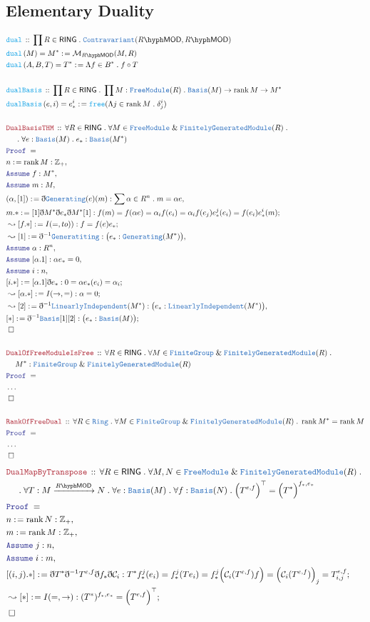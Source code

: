 \documentclass[12pt]{scrartcl}
\newcommand{\TYPE}[1]{\textcolor{NavyBlue}{\mathtt{#1}}}
\newcommand{\FUNC}[1]{\textcolor{Cerulean}{\mathtt{#1}}}
\newcommand{\LOGIC}[1]{\textcolor{Blue}{\mathtt{#1}}}
\newcommand{\THM}[1]{\textcolor{Maroon}{\mathtt{#1}}}
\renewcommand{\.}{\; . \;}
\newcommand{\de}{: \kern 0.1pc =}
\newcommand{\Act}[1]{\left(#1\right)}
\newcommand{\Theorem}[2]{& \THM{#1} \, :: \, #2 \\ & \Proof = \\ }
\newcommand{\DeclareFunc}[2]{& \FUNC{#1} \, :: \, #2 \\}
\newcommand{\DefineNamedFunc}[4]{&  \FUNC{#1}\Act{#2} = #3 \de #4 \\}
\newcommand{\NewLine}{\\ & \kern 1pc}
\newcommand{\Page}[1]{ \begin{align*} #1 \end{align*}   }
\newcommand{ \bd }{ \ByDef }
\newcommand{\NoProof}{ & \ldots \\ \EndProof}
\renewcommand{\And}{\; \& \;}
\newcommand{\Int}{\mathbb{Z} }
\newcommand{\Mor}{\mathcal{M}}
\newcommand{\Say}[3]{& #1 \de #2 : #3, \\}
\newcommand{\Conclude}[3]{& #1 \de #2 : #3; \\}
\newcommand{\Derive}[3]{& \leadsto #1 \de #2 : #3, \\}
\newcommand{\DeriveConclude}[3]{& \leadsto #1 \de #2 : #3 ; \\}
\newcommand{\Assume}[2]{& \LOGIC{Assume} \; #1 : #2, \\}
\newcommand{\QED}{\; \square}
\newcommand{\EndProof}{& \QED \\}
\newcommand{\ByDef}{\eth}
\newcommand{\Proof}{\LOGIC{Proof} \; }
\newcommand{\Arrow}[1]{\xrightarrow{#1}}
\newcommand{\Contra}{\TYPE{Contravariant}}
\newcommand{\C}{\mathcal{C}}
\newcommand{\FG}{\TYPE{FiniteGroup}}
\DeclareMathOperator{\rank}{rank}
\newcommand{\Basis}{\TYPE{Basis}}
\newcommand{\FGM}{\TYPE{FinitelyGeneratedModule}}
\newcommand{\LI}{\TYPE{LinearlyIndependent}}
\newcommand{\FM}{\TYPE{FreeModule}}
\newcommand{\LMOD}[1]{#1\hyph\mathsf{MOD}}
\newcommand{\Ring}{\TYPE{Ring}}
\newcommand{\RING}{\mathsf{RING}}
\begin{document}
\subsection{Elementary Duality}
\Page{
	\DeclareFunc{dual}{\prod R \in \RING \. \Contra(\LMOD{R},\LMOD{R})}
	\DefineNamedFunc{dual}{M}{M^*}{\Mor_{\LMOD{R}}(M,R)}
	\DefineNamedFunc{dual}{A,B,T}{T^*}{\Lambda f \in B^* \. f \circ T}
	\\
	\DeclareFunc{dualBasis}{\prod R \in \RING \. \prod M : \FM(R) \. \Basis(M) \to \rank M \to M^*}
	\DefineNamedFunc{dualBasis}{e,i}{e_*^i}{\FUNC{free}(\Lambda j \in \rank M \. \delta^i_j   )}
	\\
	\Theorem{DualBasisTHM}{\forall R \in \RING \. \forall M \in \FM \And \FGM(R) \. 
		\NewLine \. \forall e : \TYPE{Basis}(M) \. e_* : \TYPE{Basis}(M^*)}
	\Say{n}{\rank M}{\Int_+}
	\Assume{f}{M^*}
	\Assume{m}{M}
	\Say{(\alpha,[1])}{\bd \TYPE{Generating}(e)(m)}{ \sum \alpha \in R^n \. m = \alpha e}
	\Conclude{m.*}{ [1]\bd M^*\bd e_*\bd M^*[1]  }
	{
		f(m) = f(\alpha e) = \alpha_i f(e_i) = \alpha_i f(e_j) e_*^j( e_i) = f(e_i)e^i_*(m)
	}
	\DeriveConclude{[f.*]}{I(=,to))}{f = f(e)e_*}
	\Derive{[1]}{\bd^{-1}\TYPE{Generatiting}}{\big(e_* : \TYPE{Generating}(M^*)\big)}
	\Assume{\alpha}{R^n}
	\Assume{[\alpha.1]}{\alpha e_* = 0}
	\Assume{i}{n}
	\Conclude{[i.*]}{[\alpha.1]\bd e_*}{ 0 = \alpha e_*(e_i) = \alpha_i }
	\DeriveConclude{[\alpha.*]}{I(\to,=)}{\alpha =0}
	\Derive{[2]}{\bd^{-1}\LI(M^*)}{\big(e_* : \LI(M^*)\big)}
	\Conclude{[*]}{\bd^{-1}\TYPE{Basis}[1][2]}{\big(e_* : \TYPE{Basis}(M)\big)}
	\EndProof
	\\
	\Theorem{DualOfFreeModuleIsFree}
	{
	\forall R \in \RING \.  \forall M \in \FG \And \FGM(R) \. \NewLine M^* : \FG \And \FGM(R) }
	\NoProof
	\\
	\Theorem{RankOfFreeDual}
	{
           \forall R \in \Ring \. \forall M \in \FG \And \FGM(R) \.
	   \rank M^* = \rank M
	}
	\NoProof
}\Page{
	\Theorem{DualMapByTranspose}{
		\forall R \in \RING \. 
		\forall M,N \in \FM \And \FGM(R) \. \NewLine \.
		\forall T : M \Arrow{\LMOD{R}} N \.
		\forall e : \TYPE{Basis}(M) \.
		\forall f : \TYPE{Basis}(N) \.
		\Big(T^{e,f}\Big)^\top = \Big(T^*\Big)^{f_*,e_*}
	}
	\Say{n}{\rank N}{\Int_+}
	\Say{m}{\rank M}{\Int_+}
	\Assume{j}{n}
	\Assume{i}{m}
	\Conclude{[(i,j).*]}{\bd T^* \bd^{-1} T^{e,f} \bd f_* \bd \C_i}{
		T^*f_*^j(e_i) = 
		f_*^j(Te_i) = 
		f_*^j\Big( \C_i(T^{e,f})f \Big) =
		\Big(  \C_i(T^{e,f}) \Big)_j  =
		T^{e,f}_{i,j}                      
	}
	\DeriveConclude{[*] }{I(=,\to) }{ (T^*)^{f_*,e_*} = \Big( T^{e,f} \Big)^\top  } 
	\EndProof
}
\end{document}
